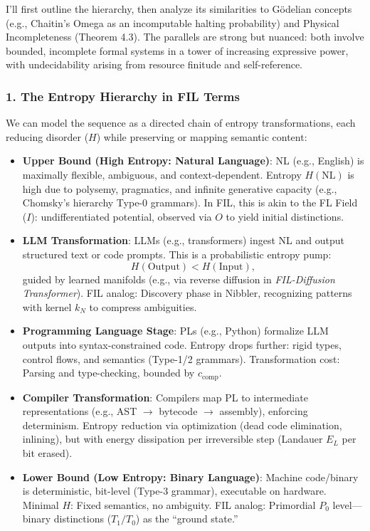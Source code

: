 \documentclass[11pt,letterpaper]{article}
\begin{document}
I’ll first outline the hierarchy, then analyze its similarities to Gödelian concepts (e.g., Chaitin’s Omega as an incomputable halting probability) and Physical Incompleteness (Theorem 4.3). The parallels are strong but nuanced: both involve bounded, incomplete formal systems in a tower of increasing expressive power, with undecidability arising from resource finitude and self-reference.

\subsubsection*{1. The Entropy Hierarchy in FIL Terms}
We can model the sequence as a directed chain of entropy transformations, each reducing disorder ($H$) while preserving or mapping semantic content:
\begin{itemize}
    \item \textbf{Upper Bound (High Entropy: Natural Language)}: NL (e.g., English) is maximally flexible, ambiguous, and context-dependent. Entropy $H(\text{NL})$ is high due to polysemy, pragmatics, and infinite generative capacity (e.g., Chomsky’s hierarchy Type-0 grammars). In FIL, this is akin to the FL Field ($I$): undifferentiated potential, observed via $O$ to yield initial distinctions.
    \item \textbf{LLM Transformation}: LLMs (e.g., transformers) ingest NL and output structured text or code prompts. This is a probabilistic entropy pump:
    \[
    H(\text{Output}) < H(\text{Input}),
    \]
    guided by learned manifolds (e.g., via reverse diffusion in \emph{FIL-Diffusion Transformer}). FIL analog: Discovery phase in Nibbler, recognizing patterns with kernel $k_N$ to compress ambiguities.
    \item \textbf{Programming Language Stage}: PLs (e.g., Python) formalize LLM outputs into syntax-constrained code. Entropy drops further: rigid types, control flows, and semantics (Type-1/2 grammars). Transformation cost: Parsing and type-checking, bounded by $c_{\text{comp}}$.
    \item \textbf{Compiler Transformation}: Compilers map PL to intermediate representations (e.g., AST $\to$ bytecode $\to$ assembly), enforcing determinism. Entropy reduction via optimization (dead code elimination, inlining), but with energy dissipation per irreversible step (Landauer $E_L$ per bit erased).
    \item \textbf{Lower Bound (Low Entropy: Binary Language)}: Machine code/binary is deterministic, bit-level (Type-3 grammar), executable on hardware. Minimal $H$: Fixed semantics, no ambiguity. FIL analog: Primordial $P_0$ level—binary distinctions ($T_1/T_0$) as the “ground state.”
\end{itemize}
\end{document}
